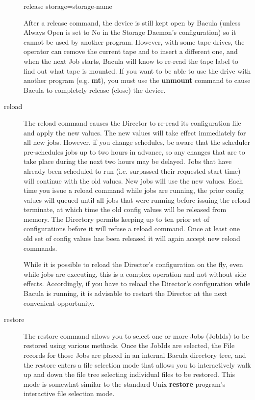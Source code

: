 \begin{description}
release storage=\lt{}storage-name\gt{}  

   After a release command, the device is still kept open by Bacula (unless
   Always Open is set to No in the Storage Daemon's configuration) so it
   cannot be used by another program.  However, with some tape drives, the
   operator can remove the current tape and to insert a different one, and
   when the next Job starts, Bacula will know to re-read the tape label to
   find out what tape is mounted.  If you want to be able to use the drive
   with another program (e.g.  {\bf mt}), you must use the {\bf unmount}
   command to cause Bacula to completely release (close) the device.

\item [reload]
  The reload command causes the Director to re-read its configuration
  file and apply the new values. The new values will take effect     
  immediately for all new jobs.  However, if you change schedules,
  be aware that the scheduler pre-schedules jobs up to two hours in
  advance, so any changes that are to take place during the next two
  hours may be delayed.  Jobs that have already been scheduled to run
  (i.e. surpassed their requested start time) will continue with the
  old values.  New jobs will use the new values. Each time you issue
  a reload command while jobs are running, the prior config values   
  will queued until all jobs that were running before issuing
  the reload terminate, at which time the old config values will
  be released from memory. The Directory permits keeping up to
  ten prior set of configurations before it will refuse a reload
  command. Once at least one old set of config values has been
  released it will again accept new reload commands. 

   While it is possible to reload the Director's configuration on the fly,
   even while jobs are executing, this is a complex operation and not
   without side effects.  Accordingly, if you have to reload the Director's
   configuration while Bacula is running, it is advisable to restart the
   Director at the next convenient opportunity.

\label{restore_command}
\item [restore]
   The restore command allows you to select one or more Jobs (JobIds) to be
   restored using various methods.  Once the JobIds are selected, the File
   records for those Jobs are placed in an internal Bacula directory tree,
   and the restore enters a file selection mode that allows you to
   interactively walk up and down the file tree selecting individual files
   to be restored.  This mode is somewhat similar to the standard Unix {\bf
   restore} program's interactive file selection mode.


\end{description}
